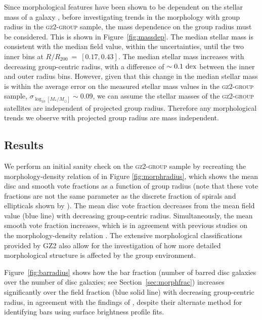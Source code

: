 \documentclass[useAMS,usenatbib]{mn2e}
\def\minor		{\color{minorcol}}
\begin{document}
Since morphological features have been shown to be dependent on the stellar mass of a galaxy \citep[e.g. the increase in the bar fraction with stellar mass; see][]{nair10, skibba12}, before investigating trends in the morphology with group radius in the \textsc{gz2-group} sample, the mass dependence on the group radius must be considered. This is shown in Figure~\ref{fig:massdep}. The median stellar mass is consistent with the median field value, within the uncertainties, until the two inner bins at $R/R_{200}~=~[0.17, 0.43]$. The median stellar mass increases with decreasing group-centric radius, with a difference of $\sim0.1~\rm{dex}$ between the inner and outer radius bins. However, given that this change in the median stellar mass is within the average error on the measured stellar mass values in the \textsc{gz2-group} sample, $\sigma_{\log_{10}[M_*/M_{\odot}]}\sim 0.09$, we can assume the stellar masses of the \textsc{gz2-group} satellites are independent of projected group radius. Therefore any morphological trends we observe with projected group radius are mass independent.

\subsection{Results}

We perform an initial sanity check on the \textsc{gz2-group} sample by recreating the morphology-density relation of \citet{dressler80} in Figure \ref{fig:morphradius}, which shows the mean disc and smooth vote fractions as a function of group radius {\minor (note that these vote fractions are not the same parameter as the discrete fraction of spirals and ellipticals shown by \citealt{dressler80})}. The mean disc vote fraction decreases from the mean field value (blue line) with decreasing group-centric radius. Simultaneously, the mean smooth vote fraction increases, which is in agreement with previous studies on the morphology-density relation \citep{dressler80, smail97, poggianti99, postman05, Bamford09}. The extensive morphological classifications provided by GZ2 also allow for the investigation of how more detailed morphological structure is affected by the group environment.  

Figure~\ref{fig:barradius} shows how the bar fraction (number of barred disc galaxies over the number of disc galaxies; see Section~\ref{sec:morphfrac}) increases significantly over the field fraction (blue solid line) with decreasing group-centric radius, in agreement with the findings of \cite{barazza09}, despite their alternate method for identifying bars using surface brightness profile fits. 
\end{document}
